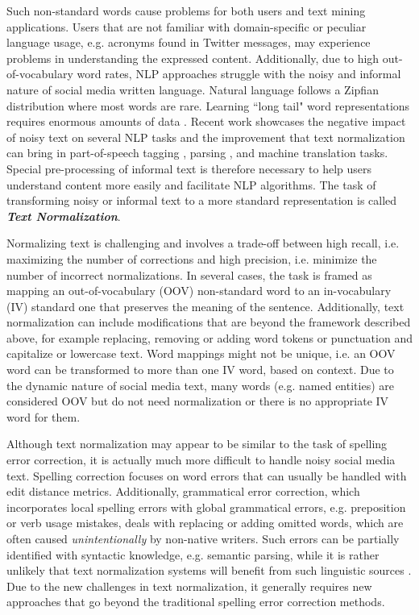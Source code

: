 \documentclass[letterpaper]{article} \usepackage{aaai19}  \usepackage{times}  \usepackage{helvet} \usepackage{courier}  \usepackage[hyphens]{url}  \usepackage{graphicx} \urlstyle{rm} \def\UrlFont{\rm}  \usepackage{graphicx}  \frenchspacing  \setlength{\pdfpagewidth}{8.5in}  \setlength{\pdfpageheight}{11in}
\newcommand{\citep}{\cite}
\begin{document}
Such non-standard words cause problems for both users and text mining applications. Users that are not familiar with domain-specific or peculiar language usage, e.g. acronyms found in Twitter messages, may experience problems in understanding the expressed content. Additionally, due to high out-of-vocabulary word rates, NLP approaches struggle with the noisy and informal nature of social media written language. Natural language follows a Zipfian distribution where most words are rare. Learning ``long tail" word representations requires enormous amounts of data \citep{bahdanau2017learning}.
Recent work showcases the negative impact of noisy text on several NLP tasks and the improvement that text normalization can bring in  part-of-speech tagging \citep{han2013lexical}, parsing \citep{zhang2013adaptive}, and machine translation \citep{hassan2013social} tasks. Special pre-processing of informal text is therefore necessary to help users understand content more easily and facilitate NLP algorithms. The task of transforming noisy or informal text to a more standard representation is called \textbf{\textit{Text Normalization}}.

Normalizing text is challenging and involves a trade-off between high recall, i.e. maximizing the number of corrections and high precision, i.e. minimize the number of incorrect normalizations. In several cases, the task is framed as mapping  an out-of-vocabulary (OOV) non-standard word to an in-vocabulary (IV) standard one that preserves the meaning of the sentence. Additionally, text normalization can include modifications that are beyond the framework described above, for example replacing, removing or adding word tokens or punctuation and capitalize or lowercase text. Word mappings might not be unique, i.e. an OOV word can be transformed to more than one IV word, based on context. Due to the dynamic nature of social media text, many words (e.g. named entities) are considered OOV but do not need normalization or there is no appropriate IV word for them.

Although text normalization may appear to be similar to the task of spelling error correction, it is actually much more difficult to handle noisy social media text.  Spelling correction focuses on word errors that can usually be handled with edit distance metrics. Additionally, grammatical error correction, which incorporates local spelling errors with global grammatical errors, e.g. preposition or verb usage mistakes, deals with replacing or adding omitted words, which are often caused \textit{unintentionally} by non-native writers. Such errors can be partially identified with syntactic knowledge, e.g. semantic parsing, while it is rather unlikely that text normalization systems will benefit from such linguistic sources \citep{baldwin2015shared}. Due to the new challenges in text normalization, it generally requires new approaches that go beyond the traditional spelling error correction methods. 
\end{document}
